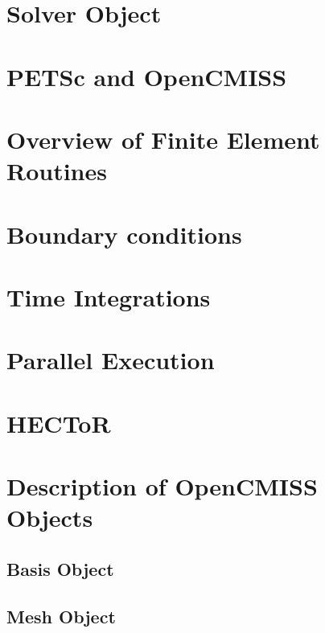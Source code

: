 

\section{Solver Object}
\label{sec:devel_solver}

\section{PETSc and OpenCMISS}
\label{sec:devel_petsc}

\section{Overview of Finite Element Routines}
\label{sec:devel_fe_routines}


\section{Boundary conditions}
\label{sec:devel_bc}

\section{Time Integrations}
\label{sec:devel_time_integrations}

\section{Parallel Execution}
\label{sec:devel_parallel}

\section{HECToR}
\label{sec:devel_hector}

\section{Description of OpenCMISS Objects}
\label{sec:devel_objects}

\subsection{Basis Object}
\label{sec:devel_basis}

\subsection{Mesh Object}
\label{sec:devel_mesh}

